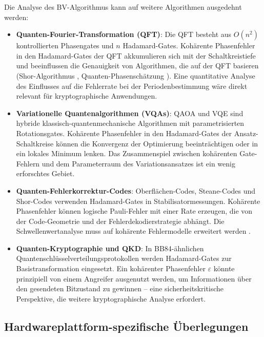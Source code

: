 ﻿\documentclass[11pt,a4paper]{article}
\theoremstyle{definition}
\newcommand{\eps}{\varepsilon}
\begin{document}
Die Analyse des BV-Algorithmus kann auf weitere Algorithmen ausgedehnt werden:

\begin{itemize}
  \item \textbf{Quanten-Fourier-Transformation (QFT)}: Die QFT besteht aus
        $O(n^2)$ kontrollierten Phasengates und $n$ Hadamard-Gates.  Kohärente
        Phasenfehler in den Hadamard-Gates der QFT akkumulieren sich mit der
        Schaltkreistiefe und beeinflussen die Genauigkeit von Algorithmen,
        die auf der QFT basieren (Shor-Algorithmus \cite{Shor1994},
        Quanten-Phasenschätzung \cite{Kitaev1995}).  Eine quantitative Analyse
        des Einflusses auf die Fehlerrate bei der Periodenbestimmung wäre
        direkt relevant für kryptographische Anwendungen.

  \item \textbf{Variationelle Quantenalgorithmen (VQAs)}: QAOA \cite{Farhi2014}
        und VQE \cite{Peruzzo2014} sind hybride klassisch-quantenmechanische
        Algorithmen mit parametrisierten Rotationsgates.  Kohärente Phasenfehler
        in den Hadamard-Gates der Ansatz-Schaltkreise können die
        Konvergenz der Optimierung beeinträchtigen oder in ein lokales
        Minimum lenken.  Das Zusammenspiel zwischen kohärenten Gate-Fehlern und
        dem Parameterraum des Variationsansatzes ist ein wenig erforschtes Gebiet.

  \item \textbf{Quanten-Fehlerkorrektur-Codes}: Oberflächen-Codes, Steane-Codes
        und Shor-Codes verwenden Hadamard-Gates in Stabilisatormessungen.
        Kohärente Phasenfehler können logische Pauli-Fehler mit einer Rate
        erzeugen, die von der Code-Geometrie und der Fehlerdekodierstrategie
        abhängt.  Die Schwellenwertanalyse muss auf kohärente Fehlermodelle
        erweitert werden \cite{Gottesman2010}.

  \item \textbf{Quanten-Kryptographie und QKD}: In BB84-ähnlichen
        Quantenschlüsselverteilungsprotokollen werden Hadamard-Gates zur
        Basistransformation eingesetzt.  Ein kohärenter Phasenfehler $\eps$
        könnte prinzipiell von einem Angreifer ausgenutzt werden, um
        Informationen über den gesendeten Bitzustand zu gewinnen -- eine
        sicherheitskritische Perspektive, die weitere kryptographische Analyse erfordert.
\end{itemize}

\subsection{Hardwareplattform-spezifische Überlegungen}
\label{subsec:hardware}
\end{document}
